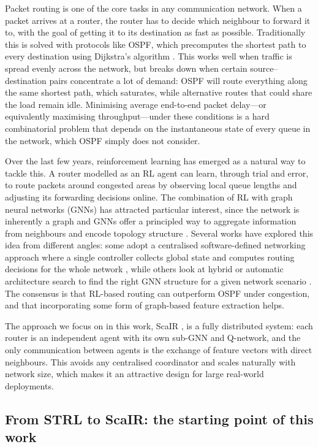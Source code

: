 \documentclass[10pt,twocolumn,letterpaper]{article}
\begin{document}
Packet routing is one of the core tasks in any communication network.
When a packet arrives at a router, the router has to decide which
neighbour to forward it to, with the goal of getting it to its
destination as fast as possible. Traditionally this is solved with
protocols like OSPF, which precomputes the shortest path to every
destination using Dijkstra's algorithm \cite{dijkstra1959}. This works
well when traffic is spread evenly across the network, but breaks down
when certain source--destination pairs concentrate a lot of demand:
OSPF will route everything along the same shortest path, which
saturates, while alternative routes that could share the load remain
idle. Minimising average end-to-end packet delay---or equivalently
maximising throughput---under these conditions is a hard combinatorial
problem that depends on the instantaneous state of every queue in the
network, which OSPF simply does not consider.

Over the last few years, reinforcement learning has emerged as a natural
way to tackle this. A router modelled as an RL agent can learn, through
trial and error, to route packets around congested areas by observing
local queue lengths and adjusting its forwarding decisions online. The
combination of RL with graph neural networks (GNNs) has attracted
particular interest, since the network is inherently a graph and GNNs
offer a principled way to aggregate information from neighbours and
encode topology structure \cite{survey_gnn_drl}. Several works have
explored this idea from different angles: some adopt a centralised
software-defined networking approach where a single controller collects
global state and computes routing decisions for the whole network
\cite{upc_routing}, while others look at hybrid or automatic
architecture search to find the right GNN structure for a given network
scenario \cite{autognn}. The consensus is that RL-based routing can
outperform OSPF under congestion, and that incorporating some form of
graph-based feature extraction helps.

The approach we focus on in this work, ScaIR \cite{scair2025}, is a
fully distributed system: each router is an independent agent with its
own sub-GNN and Q-network, and the only communication between agents is
the exchange of feature vectors with direct neighbours. This avoids any
centralised coordinator and scales naturally with network size, which
makes it an attractive design for large real-world deployments.

\subsection{From STRL to ScaIR: the starting point of this work}
\end{document}
